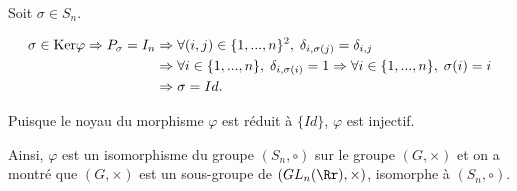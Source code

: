 {\begin{enumerate}
{Soit $\sigma\in S_n$.

\begin{align*}\ensuremath
\sigma\in\mbox{Ker}\varphi\Rightarrow P_\sigma=I_n&\Rightarrow\forall(i,j)\in\{1,...,n\}^2,\;\delta_{i,\sigma(j)}=\delta_{i,j}\\
 &\Rightarrow \forall i\in\{1,...,n\},\;\delta_{i,\sigma(i)}=1\Rightarrow\forall i\in\{1,...,n\},\;\sigma(i)=i\\
 &\Rightarrow\sigma=Id.
\end{align*}

Puisque le noyau du morphisme $\varphi$ est réduit à $\{Id\}$, $\varphi$ est injectif.

Ainsi, $\varphi$ est un isomorphisme du groupe $(S_n,\circ)$ sur le groupe $(G,\times)$ et on a montré que $(G,\times)$ est un sous-groupe de $(GL_n(\Rr),\times)$, isomorphe à $(S_n,\circ)$.}
\end{enumerate}
}